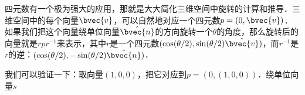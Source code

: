 

四元数有一个极为强大的应用，那就是大大简化三维空间中旋转的计算和推导．三维空间中的每个向量$\bvec{v}$，可以自然地对应一个四元数$p=(0, \bvec{v})$．如果我们把这个向量绕单位向量$\hat{\bvec{n}}$的方向旋转一个$\theta$的角度，那么旋转后的向量就是$rpr^{-1}$来表示，其中$r$是一个四元数$(\cos(\theta/2), \sin(\theta/2)\hat{\bvec{v}})$，而$r^{-1}$是$r$的逆：$(\cos(\theta/2), -\sin(\theta/2)\hat{\bvec{n}})$．

我们可以验证一下：取向量$(1, 0, 0)$，把它对应到$p=(0, (1, 0, 0))$．绕单位向量$s$





